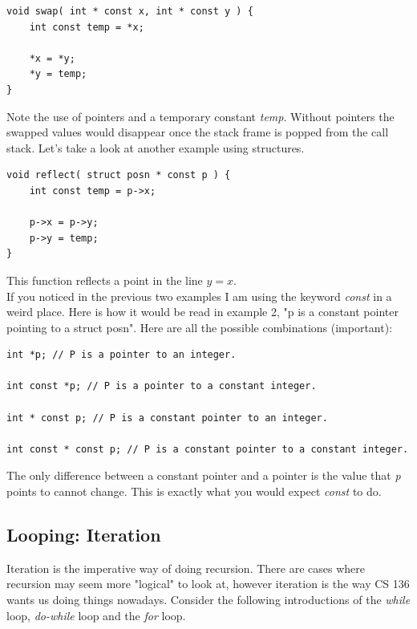 \documentclass[12pt,extarticle]{article}
\begin{document}
\lstset {
	language=c
}
\begin{lstlisting}
void swap( int * const x, int * const y ) {
	int const temp = *x;
	
	*x = *y;
	*y = temp;
}
\end{lstlisting}

Note the use of pointers and a temporary constant \emph{temp}. Without pointers the swapped values would disappear once the stack frame is popped from the call stack. Let's take a look at another example using structures.

\lstset {
	language=c
}
\begin{lstlisting}
void reflect( struct posn * const p ) {
	int const temp = p->x;
	
	p->x = p->y;
	p->y = temp;
}
\end{lstlisting}

This function reflects a point in the line $y = x$.\\

If you noticed in the previous two examples I am using the keyword \emph{const} in a weird place. Here is how it would be read in example 2, "p is a constant pointer pointing to a struct posn". Here are all the possible combinations (important):\\

\lstset {
	language=c
}
\begin{lstlisting}
int *p; // P is a pointer to an integer.

int const *p; // P is a pointer to a constant integer.

int * const p; // P is a constant pointer to an integer.

int const * const p; // P is a constant pointer to a constant integer.
\end{lstlisting}

The only difference between a constant pointer and a pointer is the value that \emph{p} points to cannot change. This is exactly what you would expect \emph{const} to do.

\subsection{Looping: Iteration}

Iteration is the imperative way of doing recursion. There are cases where recursion may seem more "logical" to look at, however iteration is the way CS 136 wants us doing things nowadays. Consider the following introductions of the \emph{while} loop, \emph{do-while} loop and the \emph{for} loop.\\
\end{document}
